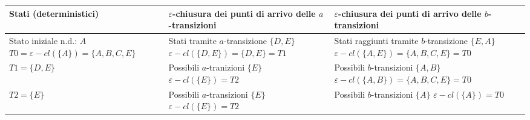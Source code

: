 \documentclass{standalone}
\providecommand\lightrule{%
	\arrayrulecolor{black!30}%
	\midrule[\lightrulewidth]%
	\arrayrulecolor{black}}
\begin{document}
\begin{tabularx}{\textwidth}{XXX}
		Stati (deterministici) & \(\varepsilon\)-chiusura dei punti di arrivo delle \(a\)-transizioni & \(\varepsilon\)-chiusura dei punti di arrivo delle \(b\)-transizioni \\
    \midrule
        Stato iniziale n.d.: \(A\) \newline
        \(T0 = \varepsilon-cl(\{A\}) = \{A, B, C, E\}\)
        &
        Stati tramite \(a\)-transizione \(\{D,E\}\) \newline
        \(\varepsilon-cl(\{D,E\}) = \{D,E\} = T1\) \newline
        [T1 unmarked]
        &
        Stati raggiunti tramite \(b\)-transizione \(\{E, A\}\) \newline
        \(\varepsilon-cl(\{A,E\}) = \{A,B,C,E\} = T0\) 
        \\ \lightrule
        \(T1 = \{D,E\}\)
        &
        Possibili \(a\)-tranizioni \(\{E\}\) \newline
        \(\varepsilon-cl(\{E\}) = T2\) \newline
        [T2 unmarked]
        &
        Possibili \(b\)-transizioni \(\{A,B\}\) \newline
        \(\varepsilon-cl(\{A,B\}) = \{A, B, C, E\} = T0\) 
        \\ \lightrule
        \(T2 = \{E\}\)
        &
        Possibili \(a\)-transizioni \(\{E\}\)
        \(\varepsilon-cl(\{E\}) = T2\)
        &
        Possibili \(b\)-transizioni \(\{A\}\)
        \(\varepsilon-cl(\{A\}) = T0\)
        \\
\end{tabularx}
\end{document}
